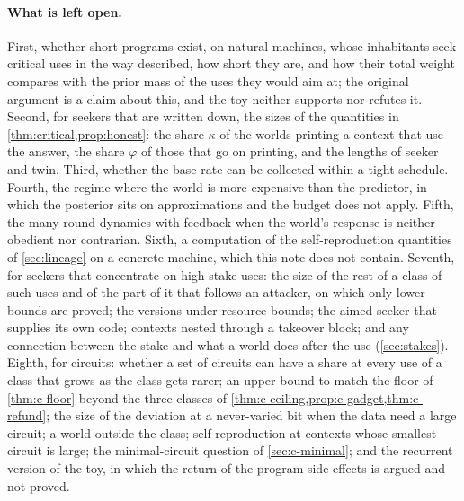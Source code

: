 \paragraph{What is left open.} First, whether short programs exist, on natural machines, whose inhabitants
seek critical uses in the way described, how short they are, and how their total weight compares with the
prior mass of the uses they would aim at; the original argument is a claim about this, and the toy neither
supports nor refutes it. Second, for seekers that are written down, the sizes of the quantities in
\cref{thm:critical,prop:honest}: the share $\kappa$ of the worlds printing a context that use the answer, the
share $\varphi$ of those that go on printing, and the lengths of seeker and twin. Third, whether the base rate
can be collected within a tight schedule. Fourth, the regime where the world is more expensive than the
predictor, in which the posterior sits on approximations and the budget does not apply. Fifth, the many-round
dynamics with feedback when the world's response is neither obedient nor contrarian. Sixth, a computation of
the self-reproduction quantities of \cref{sec:lineage} on a concrete machine, which this note does not
contain. Seventh, for seekers that concentrate on high-stake uses: the size of the rest of a class of such
uses and of the part of it that follows an attacker, on which only lower bounds are proved; the versions
under resource bounds; the aimed seeker that supplies its own code; contexts nested through a takeover block;
and any connection between the stake and what a world does after the use (\cref{sec:stakes}). Eighth, for
circuits: whether a set of circuits can have a share at every use of a class that grows as the class gets
rarer; an upper bound to match the floor of \cref{thm:c-floor} beyond the three classes of
\cref{thm:c-ceiling,prop:c-gadget,thm:c-refund}; the size of the deviation at a never-varied bit when the
data need a large circuit; a world outside the class; self-reproduction at contexts whose smallest circuit
is large; the
minimal-circuit question of \cref{sec:c-minimal}; and the recurrent
version of the toy, in which the return of the program-side effects is argued and not proved.
